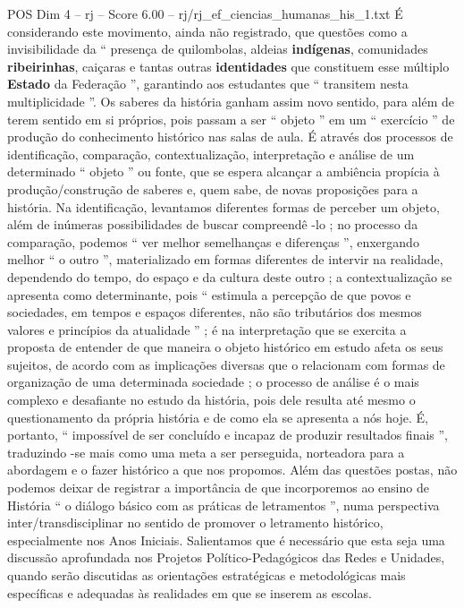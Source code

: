 \begin{textsample}{POS Dim 4 – rj – Score 6.00 – rj/rj\_ef\_ciencias\_humanas\_his\_1.txt}
É considerando este movimento, ainda não registrado, que questões como a invisibilidade da “ presença de quilombolas, aldeias \textbf{indígenas}, comunidades \textbf{ribeirinhas}, caiçaras e tantas outras \textbf{identidades} que constituem esse múltiplo \textbf{Estado} da Federação ”, garantindo aos estudantes que “ transitem nesta multiplicidade ”.
Os saberes da história ganham assim novo sentido, para além de terem sentido em si próprios, pois passam a ser “ objeto ” em um “ exercício ” de produção do conhecimento histórico nas salas de aula.
É através dos processos de identificação, comparação, contextualização, interpretação e análise de um determinado “ objeto ” ou fonte, que se espera alcançar a ambiência propícia à produção/construção de saberes e, quem sabe, de novas proposições para a história.
Na identificação, levantamos diferentes formas de perceber um objeto, além de inúmeras possibilidades de buscar compreendê -lo ; no processo da comparação, podemos “ ver melhor semelhanças e diferenças ”, enxergando melhor “ o outro ”, materializado em formas diferentes de intervir na realidade, dependendo do tempo, do espaço e da cultura deste outro ; a contextualização se apresenta como determinante, pois “ estimula a percepção de que povos e sociedades, em tempos e espaços diferentes, não são tributários dos mesmos valores e princípios da atualidade ” ; é na interpretação que se exercita a proposta de entender de que maneira o objeto histórico em estudo afeta os seus sujeitos, de acordo com as implicações diversas que o relacionam com formas de organização de uma determinada sociedade ; o processo de análise é o mais complexo e desafiante no estudo da história, pois dele resulta até mesmo o questionamento da própria história e de como ela se apresenta a nós hoje.
É, portanto, “ impossível de ser concluído e incapaz de produzir resultados finais ”, traduzindo -se mais como uma meta a ser perseguida, norteadora para a abordagem e o fazer histórico a que nos propomos.
Além das questões postas, não podemos deixar de registrar a importância de que incorporemos ao ensino de História “ o diálogo básico com as práticas de letramentos ”, numa perspectiva inter/transdisciplinar no sentido de promover o letramento histórico, especialmente nos Anos Iniciais.
Salientamos que é necessário que esta seja uma discussão aprofundada nos Projetos Político-Pedagógicos das Redes e Unidades, quando serão discutidas as orientações estratégicas e metodológicas mais específicas e adequadas às realidades em que se inserem as escolas.

\end{textsample}
